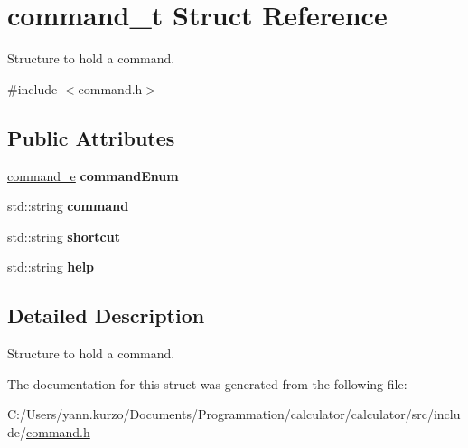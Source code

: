 \hypertarget{structcommand__t}{}\section{command\+\_\+t Struct Reference}
\label{structcommand__t}


Structure to hold a command.  




{\ttfamily \#include $<$command.\+h$>$}

\subsection*{Public Attributes}
\begin{DoxyCompactItemize}
\item 
\hypertarget{structcommand__t_a482126330d56b967d7428d61cc5b7d6b}{}\hyperlink{command_8h_aafce48252f7b3163fa15e458dd84ba12}{command\+\_\+e} {\bfseries command\+Enum}\label{structcommand__t_a482126330d56b967d7428d61cc5b7d6b}

\item 
\hypertarget{structcommand__t_ac126c83fffc4006f8573bb0913f0e210}{}std\+::string {\bfseries command}\label{structcommand__t_ac126c83fffc4006f8573bb0913f0e210}

\item 
\hypertarget{structcommand__t_a2c5eb968130a5e8dcd441fa423008fbe}{}std\+::string {\bfseries shortcut}\label{structcommand__t_a2c5eb968130a5e8dcd441fa423008fbe}

\item 
\hypertarget{structcommand__t_aea1619c73e305ebac8751c5aefdf7e6b}{}std\+::string {\bfseries help}\label{structcommand__t_aea1619c73e305ebac8751c5aefdf7e6b}

\end{DoxyCompactItemize}


\subsection{Detailed Description}
Structure to hold a command. 

The documentation for this struct was generated from the following file\+:\begin{DoxyCompactItemize}
\item 
C\+:/\+Users/yann.\+kurzo/\+Documents/\+Programmation/calculator/calculator/src/include/\hyperlink{command_8h}{command.\+h}\end{DoxyCompactItemize}

